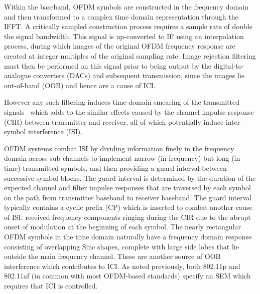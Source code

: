 Within the baseband, OFDM symbols are constructed in the frequency domain and then transformed to a complex time domain representation through the IFFT.
A critically sampled construction process requires a sample rate of double the signal bandwidth.
This signal is up-converted to IF using an interpolation process, during which images of the original OFDM frequency response are created at integer multiples of the original sampling rate.
Image rejection filtering must then be performed on this signal prior to being output by the digital-to-analogue converters (DACs) and subsequent transmission, since the images lie out-of-band (OOB) and hence are a cause of ICI.

However any such filtering induces time-domain smearing of the transmitted signals~\cite{Faulkner2000} which adds to the similar effects caused by the channel impulse response (CIR) between transmitter and receiver, all of which potentially induce inter-symbol interference (ISI).

OFDM systems combat ISI by dividing information finely in the frequency domain across sub-channels to implement narrow (in frequency) but long (in time) transmitted symbols, and then providing a guard interval between successive symbol blocks.
The guard interval is determined by the duration of the expected channel and filter impulse responses that are traversed by each symbol on the path from transmitter baseband to receiver baseband.
The guard interval typically contains a cyclic prefix (CP) which is inserted to combat another cause of ISI: received frequency components ringing during the CIR due to the abrupt onset of modulation at the beginning of each symbol.
%
The nearly rectangular OFDM symbols in the time domain naturally have a frequency domain response consisting of overlapping Sinc shapes, complete with large side lobes that lie outside the main frequency channel.
These are another source of OOB interference which contributes to ICI.
As noted previously, both 802.11p and 802.11af (in common with most OFDM-based standards) specify an SEM which requires that ICI is controlled.

